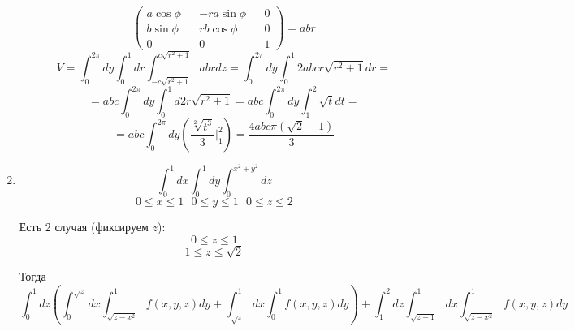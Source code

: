 \documentclass[11pt]{article}
\begin{document}
\begin{enumerate}
\begin{enumerate}
$$\begin{pmatrix}
			a\cos\phi && -ra\sin\phi && 0\\
			b\sin\phi && rb\cos\phi && 0\\
			0 && 0 && 1
		\end{pmatrix} =abr$$
		$$ V=\int_{0}^{2\pi}dy\int_{0}^{1}dr\int_{-c\sqrt{r^2+1}}^{c\sqrt{r^2+1}}abr dz  = \int_{0}^{2\pi} dy \int_{0}^{1} 2abcr\sqrt{r^2+1}dr=$$ $$ = abc\int_{0}^{2\pi}dy\int_{0}^{1} d2r \sqrt{r^2+1}=abc\int_{0}^{2\pi} dy \int_{1}^{2} \sqrt{t}dt= $$ $$ = abc\int_{0}^{2\pi} dy (\frac{\sqrt[2]{t^3}}{3}|^2_1)=\frac{4abc\pi(\sqrt{2}-1)}{3}$$
	\end{enumerate}
	\item $$\int_0^1dx\int_0^1dy\int_0^{x^2+y^2}dz$$
	$$0 \leq x \leq 1\:\:\:0 \leq y \leq 1\:\:\:0 \leq z \leq 2$$
	
	Есть 2 случая (фиксируем $z$):
	$$0 \leq z \leq 1$$
	$$1 \leq z \leq \sqrt{2}$$  
	
	Тогда
	$$\int_0^1dz\left(\int_0^{\sqrt{z}}dx\int_{\sqrt{z-x^2}}^{1}f(x,y,z)dy + \int_{\sqrt{z}}^1dx\int_{0}^{1}f(x,y,z)dy\right) + \int_1^2dz\int_{\sqrt{z-1}}^1dx\int_{\sqrt{z-x^2}}^{1}f(x,y,z)dy$$
	\end{enumerate}
\end{document}
